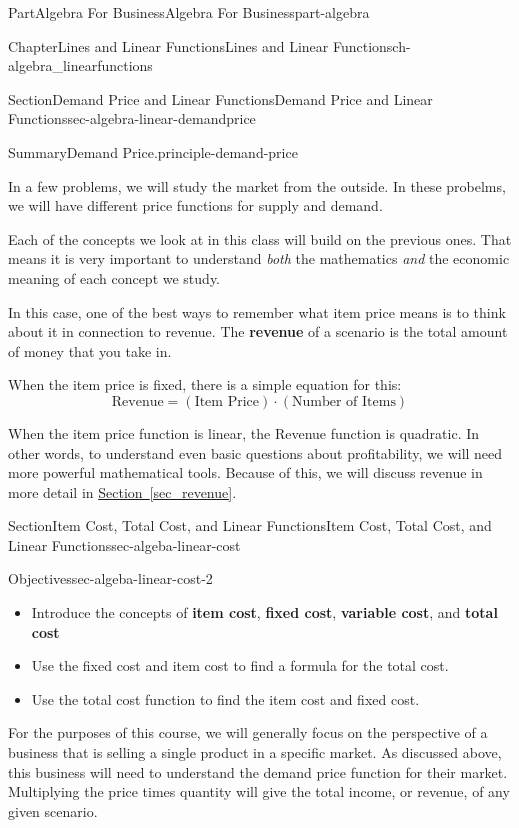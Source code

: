 \documentclass{tufte-book}
\newcommand{\xreffont}{\relax}
\newcommand{\terminology}[1]{\textbf{#1}}
\numberwithin{equation}{chapter}
\begin{document}
\begin{partptx}{Part}{Algebra For Business}{}{Algebra For Business}{}{}{part-algebra}
\begin{chapterptx}{Chapter}{Lines and Linear Functions}{}{Lines and Linear Functions}{}{}{ch-algebra_linearfunctions}
\begin{sectionptx}{Section}{Demand Price and Linear Functions}{}{Demand Price and Linear Functions}{}{}{sec-algebra-linear-demandprice}
\begin{assemblage}{Summary}{Demand Price.}{principle-demand-price}
\begin{itemize}[label=\textbullet]
\par
In a few problems, we will study the market from the outside.  In these probelms, we will have different price functions for supply and demand.%
\end{itemize}
%
\end{assemblage}
Each of the concepts we look at in this class will build on the previous ones.  That means it is very important to understand \emph{both} the mathematics \emph{and} the economic meaning of each concept we study.%
\par
In this case, one of the best ways to remember what item price means is to think about it in connection to revenue. The \terminology{revenue} of a scenario is the total amount of money that you take in.%
\par
When the item price is fixed, there is a simple equation for this:%
\begin{equation*}
\text{Revenue} = (\text{Item Price})\cdot(\text{Number of Items})
\end{equation*}
%
\par
When the item price function is linear, the Revenue function is quadratic. In other words, to understand even basic questions about profitability, we will need more powerful mathematical tools. Because of this, we will discuss revenue in more detail in \hyperref[sec_revenue]{Section~{\xreffont\ref{sec_revenue}}}.%
\end{sectionptx}
%
%
\typeout{************************************************}
\typeout{************************************************}
%
\begin{sectionptx}{Section}{Item Cost, Total Cost, and Linear Functions}{}{Item Cost, Total Cost, and Linear Functions}{}{}{sec-algeba-linear-cost}
\begin{objectives}{Objectives}{sec-algeba-linear-cost-2}
%
\begin{itemize}[label=\textbullet]
\item{}Introduce the concepts of \terminology{item cost}, \terminology{fixed cost}, \terminology{variable cost}, and \terminology{total cost}%
\item{}Use the fixed cost and item cost to find a formula for the total cost.%
\item{}Use the total cost function to find the item cost and fixed cost.%
\end{itemize}
\end{objectives}
For the purposes of this course, we will generally focus on the perspective of a business that is selling a single product in a specific market. As discussed above, this business will need to understand the demand price function for their market. Multiplying the price times quantity will give the total income, or revenue, of any given scenario.%

\end{sectionptx}
\end{chapterptx}
\end{partptx}
\end{document}
